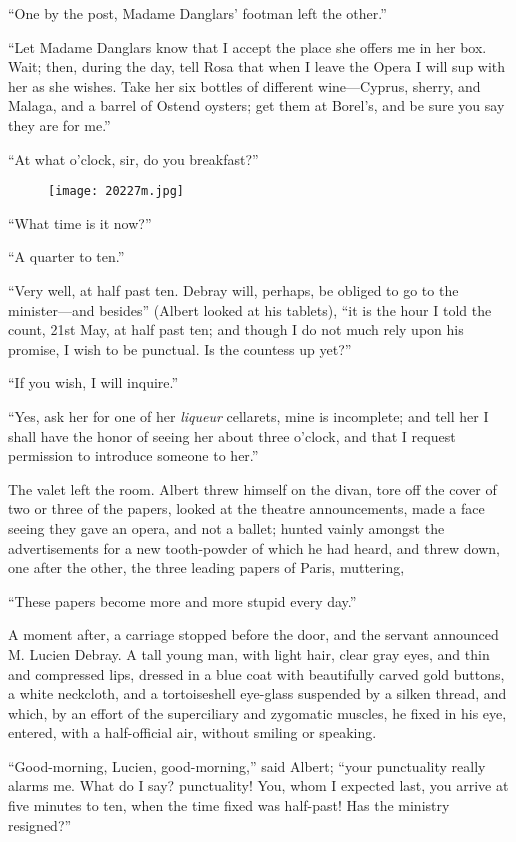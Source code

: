 “One by the post, Madame Danglars’ footman left the other.”

“Let Madame Danglars know that I accept the place she offers me in her
box. Wait; then, during the day, tell Rosa that when I leave the Opera
I will sup with her as she wishes. Take her six bottles of different
wine—Cyprus, sherry, and Malaga, and a barrel of Ostend oysters; get
them at Borel’s, and be sure you say they are for me.”

“At what o’clock, sir, do you breakfast?”

\begin{figure}[ht]
\texttt{[image: 20227m.jpg]}
\end{figure}

“What time is it now?”

“A quarter to ten.”

“Very well, at half past ten. Debray will, perhaps, be obliged to go to
the minister—and besides” (Albert looked at his tablets), “it is the
hour I told the count, 21st May, at half past ten; and though I do not
much rely upon his promise, I wish to be punctual. Is the countess up
yet?”

“If you wish, I will inquire.”

“Yes, ask her for one of her \textit{liqueur} cellarets, mine is incomplete;
and tell her I shall have the honor of seeing her about three o’clock,
and that I request permission to introduce someone to her.”

The valet left the room. Albert threw himself on the divan, tore off
the cover of two or three of the papers, looked at the theatre
announcements, made a face seeing they gave an opera, and not a ballet;
hunted vainly amongst the advertisements for a new tooth-powder of
which he had heard, and threw down, one after the other, the three
leading papers of Paris, muttering,

“These papers become more and more stupid every day.”

A moment after, a carriage stopped before the door, and the servant
announced M. Lucien Debray. A tall young man, with light hair, clear
gray eyes, and thin and compressed lips, dressed in a blue coat with
beautifully carved gold buttons, a white neckcloth, and a tortoiseshell
eye-glass suspended by a silken thread, and which, by an effort of the
superciliary and zygomatic muscles, he fixed in his eye, entered, with
a half-official air, without smiling or speaking.

“Good-morning, Lucien, good-morning,” said Albert; “your punctuality
really alarms me. What do I say? punctuality! You, whom I expected
last, you arrive at five minutes to ten, when the time fixed was
half-past! Has the ministry resigned?”

